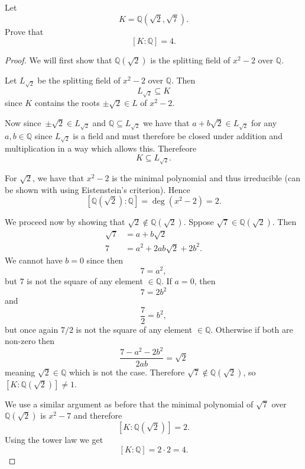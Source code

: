 \begin{prob}
    Let 
    \[
        K = \mathbb Q(\sqrt 2, \sqrt 7).
    \]
    Prove that 
    \[
        [K : \mathbb Q] = 4. 
    \]
\end{prob}
\begin{proof}
    We will first show that $\mathbb Q(\sqrt 2)$ is the 
    splitting field of $x^2 - 2$ over 
    $\mathbb Q$. 

    Let $L_{\sqrt 2}$ be the splitting field of $x^2 - 2$ over 
    $\mathbb Q$. Then 
    \[
        L_{\sqrt 2} \subseteq K
    \]
    since $K$ contains the roots $\pm \sqrt 2 \in L$ of $x^2 - 2$.

    Now since $\pm \sqrt 2 \in L_{\sqrt 2}$ and 
    $\mathbb Q\subseteq L_{\sqrt 2}$ we have that 
    $a + b\sqrt 2 \in L_{\sqrt 2}$ for any 
    $a,b \in \mathbb Q$ since $L_{\sqrt 2}$ is a field 
    and must therefore be closed under addition and multiplication 
    in a way which allows this. Therefeore 
    \[
        K \subseteq L_{\sqrt 2}. 
    \]

    For $\sqrt 2$, we have that $x^2 - 2$ is the minimal 
    polynomial and thus irreducible (can be shown with using 
    Eistenstein's criterion). Hence 
    \[
        [\mathbb Q(\sqrt 2) : \mathbb Q] = \deg(x^2 - 2) = 2. 
    \]

    We proceed now by showing that $\sqrt 2 \not \in \mathbb Q(\sqrt 2)$. 
    Sppose $\sqrt 7 \in \mathbb Q(\sqrt 2)$. Then 
    \begin{align*}
        \sqrt 7 &= a + b\sqrt 2 \\ 
        7 &= a^2 + 2ab\sqrt2 + 2b^2. 
    \end{align*}
    We cannot have $b = 0$ since then 
    \[
        7 = a^2, 
    \]
    but $7$ is not the square of any 
    element $\in \mathbb Q$. 
    If $a = 0$, then 
    \[
        7 = 2b^2 
    \]
    and 
    \[
        \frac{7}{2} = b^2,
    \]
    but once again $7/2$ is not the 
    square of any element $\in\mathbb Q$.
    Otherwise if both are non-zero then 
    \[
        \frac{7 - a^2 - 2b^2}{2ab} = \sqrt 2
    \]
    meaning $\sqrt 2 \in \mathbb Q$ which is 
    not the case. Therefore $\sqrt 7 \not \in 
    \mathbb Q(\sqrt 2)$, so $[K:\mathbb Q(\sqrt 2)] \neq 1$. 
    
    We use a similar argument as before that the minimal 
    polynomial of $\sqrt 7$ over $\mathbb Q(\sqrt 2)$ is 
    $x^2 - 7$ and therefore 
    \[
        [K : \mathbb Q(\sqrt 2)] = 2. 
    \]
    Using the tower law we get 
    \[
        [K : \mathbb Q] = 2 \cdot 2 = 4. 
    \]
\end{proof}
